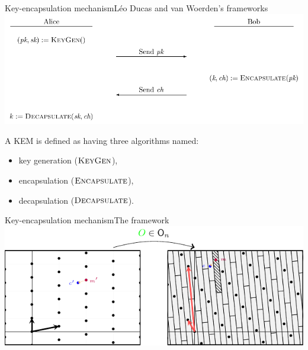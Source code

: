 \documentclass[10pt]{beamer}
\begin{document}
\begin{frame}{Key-encapsulation mechanism}{Léo Ducas and van Woerden's frameworks}
		\includegraphics[scale=0.75]{figures/kem.pdf}

		\begin{definition}[KEM]
				A KEM is defined as having three algorithms named:
				\begin{itemize}\justifying
								\item key generation ($\textsc{KeyGen}$),
						\item encapsulation ($\textsc{Encapsulate}$),
						\item decapsulation ($\textsc{Decapsulate}$).
				\end{itemize}
		\end{definition}
\end{frame}

\begin{frame}{Key-encapsulation mechanism}{The framework}
				\includegraphics{figures/lip-based-kem.pdf}
\end{frame}
\end{document}
